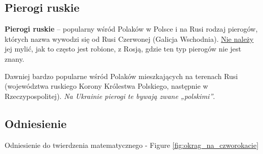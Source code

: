 \subsection{Pierogi ruskie}

\textbf{Pierogi ruskie} – popularny wśród Polaków w Polsce i na Rusi rodzaj pierogów, których nazwa wywodzi się od Rusi Czerwonej (Galicja Wschodnia). \underline{Nie należy} jej mylić, jak to często jest robione, z Rosją, gdzie ten typ pierogów nie jest znany. \par
Dawniej bardzo popularne wśród Polaków mieszkających na terenach Rusi (województwa ruskiego Korony Królestwa Polskiego, następnie w Rzeczypospolitej). \emph{Na Ukrainie pierogi te bywają zwane „polskimi”}.


\subsection{Odniesienie}
Odniesienie do twierdzenia matematycznego - Figure \ref{fig:okrag_na_czworokacie}